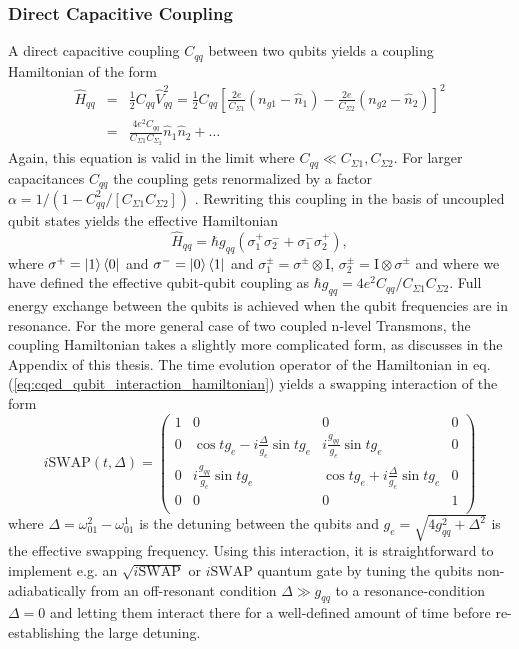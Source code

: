 \subsubsection{Direct Capacitive Coupling}

A direct capacitive coupling $C_{qq}$ between two qubits yields a coupling Hamiltonian of the form
%
\begin{eqnarray}
\hat{H}_{qq} & = & \frac{1}{2}C_{qq}\hat{V}_{qq}^2 = \frac{1}{2}C_{qq}\left[\frac{2e}{C_{\Sigma 1}}(n_{g1}-\hat{n}_1)-\frac{2e}{C_{\Sigma 2}}(n_{g2}-\hat{n}_2)\right]^2 \\
& = & \frac{4e^2 C_{qq}}{C_{\Sigma 1}C_{\Sigma_2}}\hat{n}_1\hat{n}_2+\hdots \label{eq:cqed_capacitive_coupling}
\end{eqnarray}
%
Again, this equation is valid in the limit where $C_{qq} \ll C_{\Sigma 1},C_{\Sigma 2}$. For larger capacitances $C_{qq}$ the coupling gets renormalized by a factor $\alpha = 1/(1-C_{qq}^2/[C_{\Sigma 1}C_{\Sigma 2}])$ \citep{nguyen_cooper_2008}. Rewriting this coupling in the basis of uncoupled qubit states yields the effective Hamiltonian
%
\begin{equation}
\hat{H}_{qq} = \hbar g_{qq}\left(\sigma^+_1\sigma^-_2+\sigma^-_1\sigma^+_2\right), \label{eq:cqed_qubit_interaction_hamiltonian}
\end{equation}
%
where $\sigma^+=\left| 1 \right>\left< 0 \right|$ and $\sigma^-=\left| 0 \right>\left< 1 \right|$ and $\sigma_1^\pm=\sigma^\pm\otimes \mathrm{I}$, $\sigma_2^\pm = \mathrm{I}\otimes \sigma^\pm$ and where we have defined the effective qubit-qubit coupling as $\hbar g_{qq} = 4e^2 C_{qq}/C_{\Sigma 1}C_{\Sigma 2}$. Full energy exchange between the qubits is achieved when the qubit frequencies are in resonance. For the more general case of two coupled n-level Transmons, the coupling Hamiltonian takes a slightly more complicated form, as discusses in the Appendix of this thesis. The time evolution operator of the Hamiltonian in eq. (\ref{eq:cqed_qubit_interaction_hamiltonian}) yields a swapping interaction of the form
%
\begin{equation}
i\mathrm{SWAP}(t,\Delta) = \left(
			\begin{array}{cccc}
				1 & 0 & 0 & 0 \\
				0 & \cos{t g_{e}}-i\frac{\Delta}{g_e}\sin{t g_{e}} & i \frac{g_{qq}}{g_e}\sin{t g_{e}} & 0 \\
				0 & i\frac{g_{qq}}{g_e}\sin{t g_{e}} & \cos{t g_{e}}+i\frac{\Delta}{g_{e}}\sin{t g_{e}} & 0 \\
				0 & 0 & 0 & 1 \\
			\end{array}
	\right) \label{eq:swap_with_detuning}
\end{equation}
%
where $\Delta = \omega_{01}^2-\omega_{01}^1$ is the detuning between the qubits and $g_e = \sqrt{4g_{qq}^2+\Delta^2}$ is the effective swapping frequency. Using this interaction, it is straightforward to implement e.g. an $\sqrt{i\mathrm{SWAP}}$ or $i\mathrm{SWAP}$ quantum gate by tuning the qubits non-adiabatically from an off-resonant condition $\Delta \gg g_{qq}$ to a resonance-condition $\Delta = 0$ and letting them interact there for a well-defined amount of time before re-establishing the large detuning.

